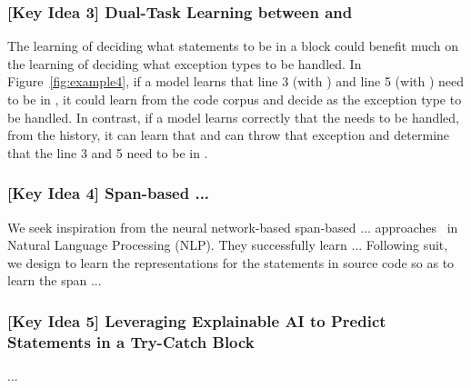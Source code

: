 \subsubsection{{\bf [Key Idea 3] Dual-Task Learning between {\xstate} and {\xtype}}} The learning of deciding what statements to be in a 
block could benefit much on the learning of deciding what exception
types to be handled. In Figure~\ref{fig:example4}, if a model learns
that line 3 (with ) and line 5 (with
) need to be in , it could learn from
the code corpus and decide  as the exception type to
be handled. In contrast, if a model learns correctly that the
 needs to be handled, from the history, it can learn
that  and  can throw that
exception and determine that the line 3 and 5 need to be in
.

{\em
\subsubsection{{\bf [Key Idea 4] Span-based ...}}
We seek inspiration from the neural network-based span-based ...
approaches~\cite{?} in Natural Language Processing (NLP). They
successfully learn ... Following suit, we design \tool to learn the
representations for the statements in source code so as to learn the
span ...}


{\em
\subsubsection{{\bf [Key Idea 5] Leveraging Explainable AI to Predict Statements in a Try-Catch Block}}
...
}

